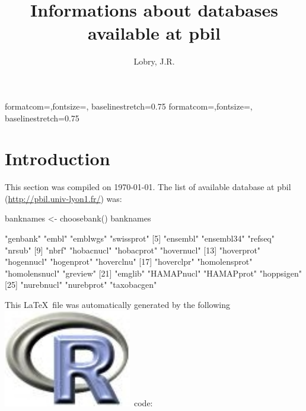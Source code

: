 \documentclass{article}
\title{Informations about databases available at pbil}
\author{Lobry, J.R.}
\begin{document}
%
%
{formatcom={\color{Sinput}},fontsize=\footnotesize, baselinestretch=0.75}
{formatcom={\color{Soutput}},fontsize=\footnotesize, baselinestretch=0.75}
%
%
\newcommand{\Rlogo}{\protect\includegraphics[height=1.8ex,keepaspectratio]{../figs/Rlogo.pdf}}
%
%
\newcommand{\seqinr}{\texttt{seqin\bf{R}}}
\newcommand{\Seqinr}{\texttt{Seqin\bf{R}}}
%
%
%
%
%


\maketitle
\label{subsequence}

\section{Introduction}
This section was compiled on \today. The list of available database at pbil 
(\url{http://pbil.univ-lyon1.fr/}) was:

\begin{Schunk}
\begin{Sinput}
 banknames <- choosebank()
 banknames
\end{Sinput}
\begin{Soutput}
 [1] "genbank"      "embl"         "emblwgs"      "swissprot"   
 [5] "ensembl"      "ensembl34"    "refseq"       "nrsub"       
 [9] "nbrf"         "hobacnucl"    "hobacprot"    "hovernucl"   
[13] "hoverprot"    "hogennucl"    "hogenprot"    "hoverclnu"   
[17] "hoverclpr"    "homolensprot" "homolensnucl" "greview"     
[21] "emglib"       "HAMAPnucl"    "HAMAPprot"    "hoppsigen"   
[25] "nurebnucl"    "nurebprot"    "taxobacgen"  
\end{Soutput}
\end{Schunk}

This \LaTeX~file was automatically generated by the following \Rlogo{}~code:
\end{document}
